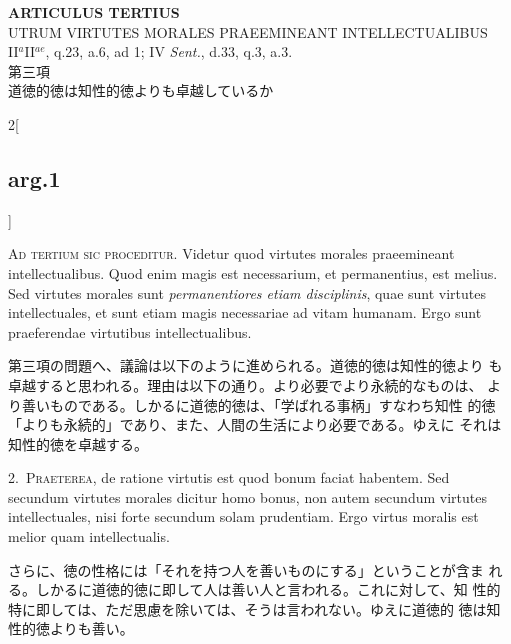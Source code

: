 \documentclass[paper=a4paper,fontsize=10pt,jafontsize=9pt,titlepage]{jlreq}
\begin{document}
\begin{center}
{\Large {\bfseries ARTICULUS TERTIUS}}\\
{\large UTRUM VIRTUTES MORALES PRAEEMINEANT INTELLECTUALIBUS}\\
 {\footnotesize II$^{a}$II$^{ae}$, q.23, a.6, ad 1; IV {\itshape Sent.}, d.33, q.3, a.3.}\\
{\Large 第三項\\道徳的徳は知性的徳よりも卓越しているか}
\end{center}

\begin{paracol}{2}[\subsection{arg.1}]

{\scshape Ad tertium sic proceditur}. Videtur quod virtutes morales
praeemineant intellectualibus. Quod enim magis est necessarium, et
permanentius, est melius. Sed virtutes morales sunt {\itshape
permanentiores etiam disciplinis}, quae sunt virtutes intellectuales,
et sunt etiam magis necessariae ad vitam humanam. Ergo sunt
praeferendae virtutibus intellectualibus.

\switchcolumn

第三項の問題へ、議論は以下のように進められる。道徳的徳は知性的徳より
 も卓越すると思われる。理由は以下の通り。より必要でより永続的なものは、
 より善いものである。しかるに道徳的徳は、「学ばれる事柄」すなわち知性
 的徳「よりも永続的」であり、また、人間の生活により必要である。ゆえに
 それは知性的徳を卓越する。


2.~{\scshape Praeterea}, de ratione virtutis est quod bonum faciat
habentem. Sed secundum virtutes morales dicitur homo bonus, non autem
secundum virtutes intellectuales, nisi forte secundum solam
prudentiam. Ergo virtus moralis est melior quam intellectualis.

\switchcolumn

さらに、徳の性格には「それを持つ人を善いものにする」ということが含ま
 れる。しかるに道徳的徳に即して人は善い人と言われる。これに対して、知
 性的特に即しては、ただ思慮を除いては、そうは言われない。ゆえに道徳的
 徳は知性的徳よりも善い。



\end{paracol}
\end{document}
